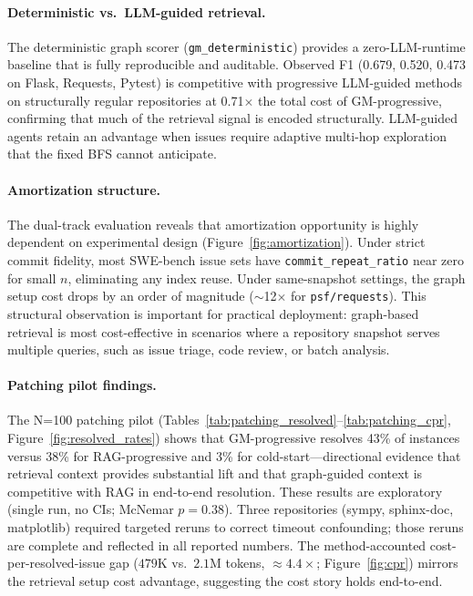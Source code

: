 \paragraph{Deterministic vs.\ LLM-guided retrieval.}
The deterministic graph scorer (\texttt{gm\_deterministic}) provides a zero-LLM-runtime baseline that is fully reproducible and auditable. Observed F1 (0.679, 0.520, 0.473 on Flask, Requests, Pytest) is competitive with progressive LLM-guided methods on structurally regular repositories at 0.71$\times$ the total cost of GM-progressive, confirming that much of the retrieval signal is encoded structurally. LLM-guided agents retain an advantage when issues require adaptive multi-hop exploration that the fixed BFS cannot anticipate.

\paragraph{Amortization structure.}
The dual-track evaluation reveals that amortization opportunity is highly dependent on experimental design (Figure~\ref{fig:amortization}). Under strict commit fidelity, most SWE-bench issue sets have \texttt{commit\_repeat\_ratio} near zero for small $n$, eliminating any index reuse. Under same-snapshot settings, the graph setup cost drops by an order of magnitude ($\sim$12$\times$ for \texttt{psf/requests}). This structural observation is important for practical deployment: graph-based retrieval is most cost-effective in scenarios where a repository snapshot serves multiple queries, such as issue triage, code review, or batch analysis.

\paragraph{Patching pilot findings.}
The N=100 patching pilot (Tables~\ref{tab:patching_resolved}--\ref{tab:patching_cpr}, Figure~\ref{fig:resolved_rates}) shows that GM-progressive resolves 43\% of instances versus 38\% for RAG-progressive and 3\% for cold-start---directional evidence that retrieval context provides substantial lift and that graph-guided context is competitive with RAG in end-to-end resolution. These results are exploratory (single run, no CIs; McNemar $p=0.38$). Three repositories (sympy, sphinx-doc, matplotlib) required targeted reruns to correct timeout confounding; those reruns are complete and reflected in all reported numbers. The method-accounted cost-per-resolved-issue gap ($479$K vs.\ $2.1$M tokens, $\approx4.4\times$; Figure~\ref{fig:cpr}) mirrors the retrieval setup cost advantage, suggesting the cost story holds end-to-end.

